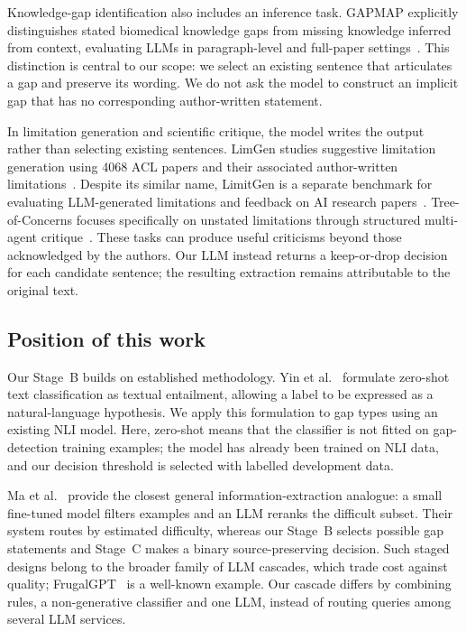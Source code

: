 Knowledge-gap identification also includes an inference task. GAPMAP explicitly distinguishes stated biomedical knowledge gaps from missing knowledge inferred from context, evaluating LLMs in paragraph-level and full-paper settings~\cite{salem2025gapmap}. This distinction is central to our scope: we select an existing sentence that articulates a gap and preserve its wording. We do not ask the model to construct an implicit gap that has no corresponding author-written statement.

In limitation generation and scientific critique, the model writes the output rather than selecting existing sentences. LimGen studies suggestive limitation generation using 4068 ACL papers and their associated author-written limitations~\cite{faizullah2024limgen}. Despite its similar name, LimitGen is a separate benchmark for evaluating LLM-generated limitations and feedback on AI research papers~\cite{xu2025llms}. Tree-of-Concerns focuses specifically on unstated limitations through structured multi-agent critique~\cite{mishra2026tree}. These tasks can produce useful criticisms beyond those acknowledged by the authors. Our LLM instead returns a keep-or-drop decision for each candidate sentence; the resulting extraction remains attributable to the original text.

\subsection{Position of this work}

Our Stage~B builds on established methodology. Yin et al.~\cite{yin2019zeroshot} formulate zero-shot text classification as textual entailment, allowing a label to be expressed as a natural-language hypothesis. We apply this formulation to gap types using an existing NLI model. Here, zero-shot means that the classifier is not fitted on gap-detection training examples; the model has already been trained on NLI data, and our decision threshold is selected with labelled development data.

Ma et al.~\cite{ma2023reranker} provide the closest general information-extraction analogue: a small fine-tuned model filters examples and an LLM reranks the difficult subset. Their system routes by estimated difficulty, whereas our Stage~B selects possible gap statements and Stage~C makes a binary source-preserving decision. Such staged designs belong to the broader family of LLM cascades, which trade cost against quality; FrugalGPT~\cite{chen2023frugalgpt} is a well-known example. Our cascade differs by combining rules, a non-generative classifier and one LLM, instead of routing queries among several LLM services.

